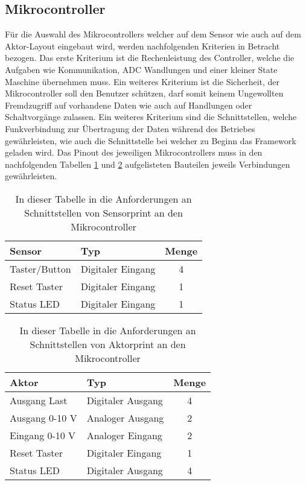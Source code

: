 \subsection{Mikrocontroller}\label{subsec: Mikrocontroller}
Für die Auswahl des Mikrocontrollers welcher auf dem Sensor wie auch auf dem Aktor-Layout eingebaut wird, werden nachfolgenden Kriterien in Betracht bezogen. Das erste Kriterium ist die Rechenleistung des Controller, welche die Aufgaben wie Kommunikation, ADC Wandlungen und einer kleiner State Maschine übernehmen muss.
Ein weiteres Kriterium ist die Sicherheit, der Mikrocontroller soll den Benutzer schützen, darf somit keinem Ungewollten Fremdzugriff auf vorhandene Daten wie auch auf Handlungen oder Schaltvorgänge zulassen. Ein weiteres Kriterium sind die Schnittstellen, welche Funkverbindung zur Übertragung der Daten während des Betriebes gewährleisten, wie auch die Schnittstelle bei welcher zu Beginn das Framework geladen wird. Das Pinout des jeweiligen Mikrocontrollers muss in den nachfolgenden Tabellen \ref{tab: MC:Sensor} und \ref{tab: MC:Aktor} aufgelisteten Bauteilen jeweils Verbindungen gewährleisten.


\begin{table}[h!]
	\centering
	\begin{tabular}{|l|l|c|}
		\hline 
		Sensor & Typ & Menge \\ 
		\hline 
		Taster/Button & Digitaler Eingang & 4 \\ 
		\hline 
		Reset Taster & Digitaler Eingang & 1 \\ 
		\hline 
		Status LED & Digitaler Eingang & 1 \\ 
		\hline 
	\end{tabular}
	\caption{In dieser Tabelle in die Anforderungen an Schnittstellen von Sensorprint an den Mikrocontroller} 
	\label{tab: MC:Sensor}
\end{table}

\begin{table}[h!]
	\centering
	\begin{tabular}{|l|l|c|}
		\hline 
		Aktor & Typ  & Menge  \\ 
		\hline 
		Ausgang Last & Digitaler Ausgang & 4 \\ 
		\hline 
		Ausgang 0-10 V & Analoger Ausgang & 2 \\ 
		\hline 
		Eingang 0-10 V & Analoger Eingang & 2 \\ 
		\hline 
		Reset Taster & Digitaler Eingang & 1 \\ 
		\hline 
		Status LED & Digitaler Ausgang & 4 \\ 
		\hline 
	\end{tabular} 
	\caption{In dieser Tabelle in die Anforderungen an Schnittstellen von Aktorprint an den Mikrocontroller}
	\label{tab: MC:Aktor}
\end{table}


